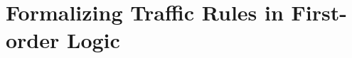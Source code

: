 \chapter[~~~~~~~~~~~~Formalizing Traffic Rules in FoL]{Formalizing Traffic Rules in First-order Logic}\label{ch:traffic-rules}









 

